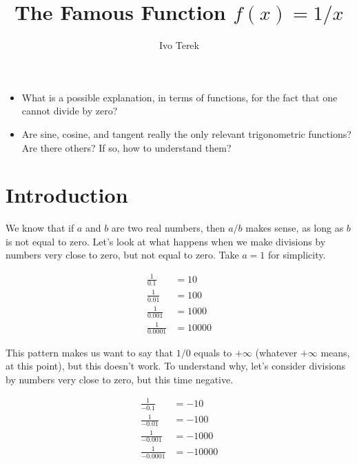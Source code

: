 \documentclass{ximera}
\author{Ivo Terek}
\title{The Famous Function $f(x)=1/x$}
\begin{document}
\begin{abstract}
  
\end{abstract}
\maketitle



\begin{motivatingQuestions}\begin{itemize}
\item What is a possible explanation, in terms of functions, for the fact that one cannot divide by zero? 
\item Are sine, cosine, and tangent really the only relevant trigonometric functions? Are there others? If so, how to understand them?
\end{itemize}\end{motivatingQuestions}



\section{Introduction}

We know that if $a$ and $b$ are two real numbers, then $a/b$ makes sense, as long as $b$ is not equal to zero. Let's look at what happens when we make divisions by numbers very close to zero, but not equal to zero. Take $a=1$ for simplicity.

\begin{align*}
  \frac{1}{0.1} &= 10 \\ \frac{1}{0.01} &= 100 \\ \frac{1}{0.001} &= 1000 \\ \frac{1}{0.0001} &= 10000
\end{align*}

This pattern makes us want to say that $1/0$ equals to $+\infty$ (whatever $+\infty$ means, at this point), but this doesn't work. To understand why, let's consider divisions by numbers very close to zero, but this time negative. 

\begin{align*}
  \frac{1}{-0.1} &= -10 \\ \frac{1}{-0.01} &= -100 \\ \frac{1}{-0.001} &= -1000 \\ \frac{1}{-0.0001} &= -10000
\end{align*}
\end{document}
